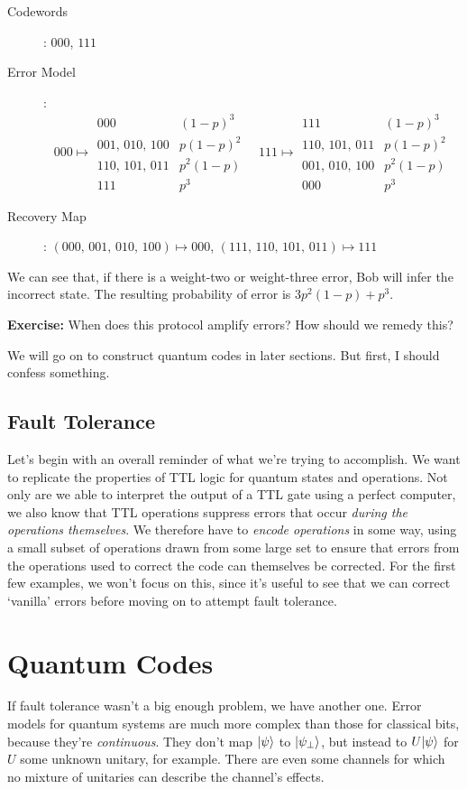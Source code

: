 \documentclass[10pt,a4paper, english]{scrartcl}
\begin{document}
\begin{description}
\item[Codewords]: $000$, $111$
\item[Error Model]:
\begin{equation}
000 \mapsto \begin{array}{cl}
000 & (1-p)^3 \\ 001,\, 010,\, 100 & p(1-p)^2 \\ 110,\, 101,\, 011 & p^2(1-p) \\ 111 & p^3
\end{array} \quad 
111 \mapsto \begin{array}{cl}
111 & (1-p)^3 \\ 110,\, 101,\, 011 & p(1-p)^2 \\ 001,\, 010,\, 100 & p^2(1-p) \\ 000 & p^3
\end{array}
\end{equation} 
\item[Recovery Map]: $(000,\,001,\,010,\,100) \mapsto 000$, $(111,\,110,\,101,\,011) \mapsto 111$
\end{description}
We can see that, if there is a weight-two or weight-three error, Bob will infer the incorrect state.
The resulting probability of error is $3p^2(1-p) + p^3$. 

\textbf{Exercise: } When does this protocol amplify errors? How should we remedy this?

We will go on to construct quantum codes in later sections. 
But first, I should confess something.
\subsection{Fault Tolerance}
Let's begin with an overall reminder of what we're trying to accomplish.
We want to replicate the properties of TTL logic for quantum states and operations.
Not only are we able to interpret the output of a TTL gate using a perfect computer, we also know that TTL operations suppress errors that occur \emph{during the operations themselves}. 
We therefore have to \emph{encode operations} in some way, using a small subset of operations drawn from some large set to ensure that errors from the operations used to correct the code can themselves be corrected. 
For the first few examples, we won't focus on this, since it's useful to see that we can correct `vanilla' errors before moving on to attempt fault tolerance.

\section{Quantum Codes}
If fault tolerance wasn't a big enough problem, we have another one. 
Error models for quantum systems are much more complex than those for classical bits, because they're \emph{continuous}. They don't map ${\left\vert{\psi}\right\rangle}$ to ${\left\vert{\psi_{\perp}}\right\rangle}$, but instead to $U{\left\vert{\psi}\right\rangle}$ for $U$ some unknown unitary, for example.
There are even some channels for which no mixture of unitaries can describe the channel's effects. 
\end{document}
